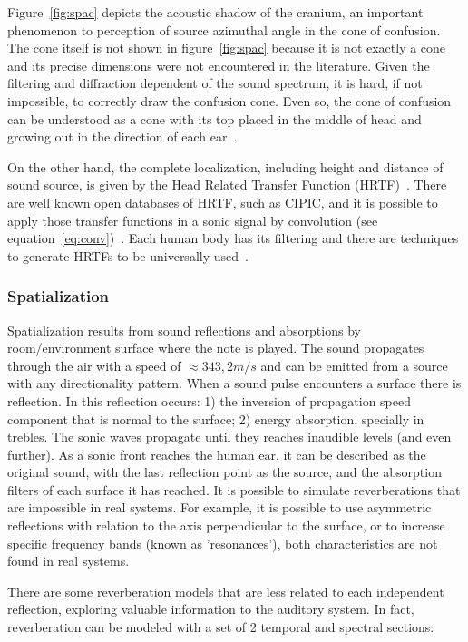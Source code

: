 \documentclass[
 aip,
 jmp,
 amsmath,amssymb,
 reprint,
]{revtex4-1}
\begin{document}
Figure~\ref{fig:spac} depicts the acoustic shadow of the cranium, an important phenomenon to perception of source azimuthal angle in the cone of confusion. The cone itself is not shown in figure~\ref{fig:spac} because it is not exactly a cone and its precise dimensions were not encountered in the literature. Given the filtering and diffraction dependent of the sound spectrum, it is hard, if not impossible, to correctly draw the confusion cone. Even so, the cone of confusion can be understood as a cone with its top placed in the middle of head and growing out in the direction of each ear~\cite{hrtf}.

On the other hand, the complete localization, including height and distance of sound source, is given by the Head Related Transfer Function (HRTF)~\cite{hrtf}. There are well known open databases of HRTF, such as CIPIC, and it is possible to apply those transfer functions in a sonic signal by convolution (see equation~\ref{eq:conv})~\cite{CIPIC}. Each human body has its filtering and there are techniques to generate HRTFs to be universally used~\cite{lazaSPA}. 

\subsubsection{Spatialization}

Spatialization results from sound reflections and absorptions by room/environment surface where the note is played. The sound propagates through the air with a speed of $\approx 343,2m/s$ and can be emitted from a source with any directionality pattern. When a sound pulse encounters a surface there is reflection. In this reflection occurs: 1) the inversion of propagation speed component that is normal to the surface;  2) energy absorption, specially in trebles. The sonic waves propagate until they reaches inaudible levels (and even further). As a sonic front reaches the human ear, it  can be described as the original sound, with the last reflection point as the source, and the absorption filters of each surface it has reached. It is possible to simulate reverberations that are impossible in real systems. For example, it is possible to use asymmetric reflections with relation to the axis perpendicular to the surface, or to increase specific frequency bands (known as 'resonances'), both characteristics are not found in real systems.

There are some reverberation models that are less related to each independent reflection, exploring valuable information to the auditory system. In fact, reverberation can be modeled with a set of 2 temporal and spectral sections:
\end{document}
